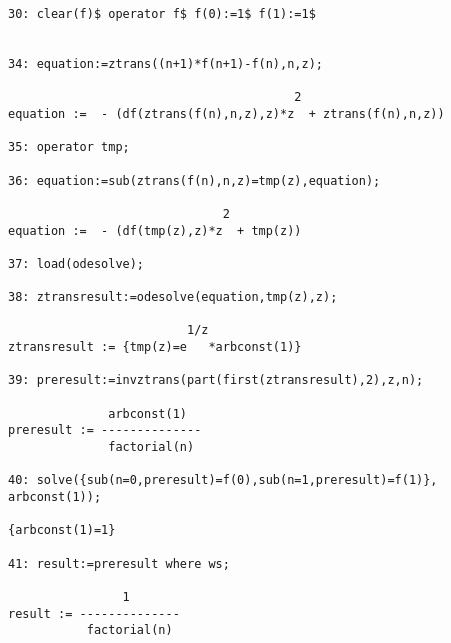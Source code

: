 \begin{verbatim}
30: clear(f)$ operator f$ f(0):=1$ f(1):=1$


34: equation:=ztrans((n+1)*f(n+1)-f(n),n,z);

                                        2
equation :=  - (df(ztrans(f(n),n,z),z)*z  + ztrans(f(n),n,z))

35: operator tmp;

36: equation:=sub(ztrans(f(n),n,z)=tmp(z),equation);

                              2
equation :=  - (df(tmp(z),z)*z  + tmp(z))

37: load(odesolve);

38: ztransresult:=odesolve(equation,tmp(z),z);

                         1/z
ztransresult := {tmp(z)=e   *arbconst(1)}

39: preresult:=invztrans(part(first(ztransresult),2),z,n);

              arbconst(1)
preresult := --------------
              factorial(n)

40: solve({sub(n=0,preresult)=f(0),sub(n=1,preresult)=f(1)},
arbconst(1));

{arbconst(1)=1}

41: result:=preresult where ws;

                1
result := --------------
           factorial(n)
\end{verbatim}
